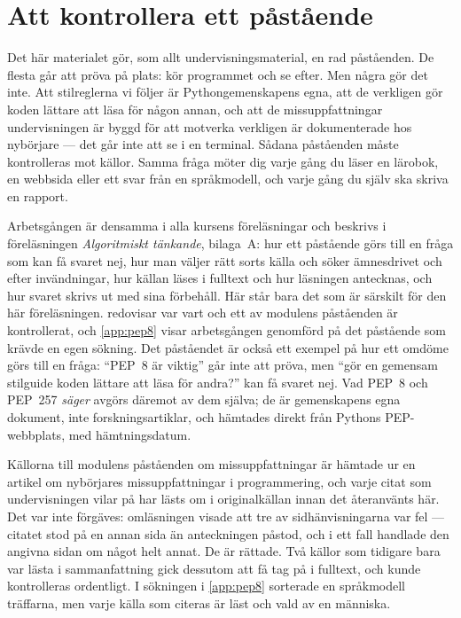 \chapter{Att kontrollera ett påstående}
\label{app:verifiera-variabler}

Det här materialet gör, som allt undervisningsmaterial, en rad
påståenden.  De flesta går att pröva på plats: kör programmet och se
efter.  Men några gör det inte.  Att stilreglerna vi följer är
Pythongemenskapens egna, att de verkligen gör koden lättare att läsa för
någon annan, och att de missuppfattningar undervisningen är byggd för att
motverka verkligen är dokumenterade hos nybörjare --- det går inte att se
i en terminal.  Sådana påståenden måste kontrolleras mot källor.
Samma fråga möter dig varje gång du läser en lärobok, en webbsida eller
ett svar från en språkmodell, och varje gång du själv ska skriva en
rapport.

Arbetsgången är densamma i alla kursens föreläsningar och beskrivs i
föreläsningen \emph{Algoritmiskt tänkande}, bilaga~A: hur ett påstående
görs till en fråga som kan få svaret nej, hur man väljer rätt sorts
källa och söker ämnesdrivet och efter invändningar, hur källan läses i
fulltext och hur läsningen antecknas, och hur svaret skrivs ut med sina
förbehåll.  Här står bara det som är särskilt för den här föreläsningen.
 redovisar var vart och ett av modulens påståenden
är kontrollerat, och \cref{app:pep8} visar arbetsgången genomförd på det
påstående som krävde en egen sökning.  Det påståendet är också ett
exempel på hur ett omdöme görs till en fråga: \enquote{PEP~8 är viktig}
går inte att pröva, men \enquote{gör en gemensam stilguide koden
lättare att läsa för andra?} kan få svaret nej.  Vad PEP~8 och PEP~257
\emph{säger} avgörs däremot av dem själva; de är gemenskapens egna
dokument, inte forskningsartiklar, och hämtades direkt från Pythons
PEP-webbplats, med hämtningsdatum.

Källorna till modulens påståenden om missuppfattningar är hämtade ur en
artikel om nybörjares missuppfattningar i
programmering\autocite{SooriBosk2026}, och varje citat som
undervisningen vilar på har lästs om i originalkällan innan det
återanvänts här.  Det var inte förgäves: omläsningen visade att tre av
sidhänvisningarna var fel --- citatet stod på en annan sida än
anteckningen påstod, och i ett fall handlade den angivna sidan om något
helt annat.  De är rättade.  Två källor som tidigare bara var lästa i
sammanfattning gick dessutom att få tag på i fulltext, och kunde
kontrolleras ordentligt.  I sökningen i \cref{app:pep8} sorterade en
språkmodell träffarna, men varje källa som citeras är läst och vald av
en människa.

